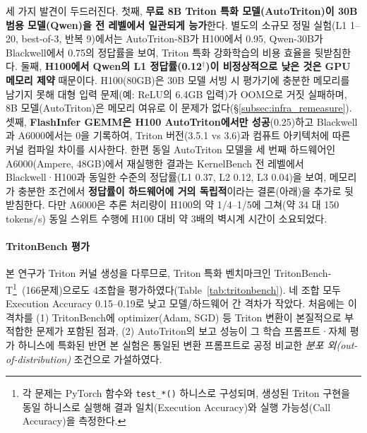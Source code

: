 \documentclass[sigplan,screen,review,anonymous]{acmart}
\begin{document}
세 가지 발견이 두드러진다. 첫째, \textbf{무료 8B Triton 특화 모델(AutoTriton)이 30B 범용 모델(Qwen)을 전 레벨에서 일관되게 능가}한다. 별도의 소규모 정밀 실험(L1 1--20, best-of-3, 반복 9)에서는 AutoTriton-8B가 H100에서 0.95, Qwen-30B가 Blackwell에서 0.75의 정답률을 보여, Triton 특화 강화학습의 비용 효율을 뒷받침한다. 둘째, \textbf{H100에서 Qwen의 L1 정답률(0.12$^{\dagger}$)이 비정상적으로 낮은 것은 GPU 메모리 제약} 때문이다. H100(80GB)은 30B 모델 서빙 시 평가기에 충분한 메모리를 남기지 못해 대형 입력 문제(예: ReLU의 6.4GB 입력)가 OOM으로 거짓 실패하며, 8B 모델(AutoTriton)은 메모리 여유로 이 문제가 없다(\S\ref{subsec:infra_remeasure}). 셋째, \textbf{FlashInfer GEMM은 H100 AutoTriton에서만 성공}(0.25)하고 Blackwell과 A6000에서는 0을 기록하여, Triton 버전(3.5.1 vs 3.6)과 컴퓨트 아키텍처에 따른 커널 컴파일 차이를 시사한다. 한편 동일 AutoTriton 모델을 세 번째 하드웨어인 A6000(Ampere, 48GB)에서 재실행한 결과는 KernelBench 전 레벨에서 Blackwell·H100과 동일한 수준의 정답률(L1 0.37, L2 0.12, L3 0.04)을 보여, 메모리가 충분한 조건에서 \textbf{정답률이 하드웨어에 거의 독립적}이라는 결론(아래)을 추가로 뒷받침한다. 다만 A6000은 추론 처리량이 H100의 약 1/4--1/5에 그쳐(약 34 대 150 tokens/s) 동일 스위트 수행에 H100 대비 약 3배의 벽시계 시간이 소요되었다.

\paragraph{TritonBench 평가}
본 연구가 Triton 커널 생성을 다루므로, Triton 특화 벤치마크인 TritonBench-T\footnote{각 문제는 PyTorch 함수와 \texttt{test\_*()} 하니스로 구성되며, 생성된 Triton 구현을 동일 하니스로 실행해 결과 일치(Execution Accuracy)와 실행 가능성(Call Accuracy)을 측정한다.}~\cite{li2025autotriton}(166문제)으로도 4조합을 평가하였다(Table~\ref{tab:tritonbench}). 네 조합 모두 Execution Accuracy 0.15--0.19로 낮고 모델/하드웨어 간 격차가 작았다. 처음에는 이 격차를 (1) TritonBench에 optimizer(Adam, SGD) 등 Triton 변환이 본질적으로 부적합한 문제가 포함된 점과, (2) AutoTriton의 보고 성능이 그 학습 프롬프트·자체 평가 하니스에 특화된 반면 본 실험은 통일된 변환 프롬프트로 공정 비교한 \emph{분포 외(out-of-distribution)} 조건으로 가설하였다.
\end{document}
